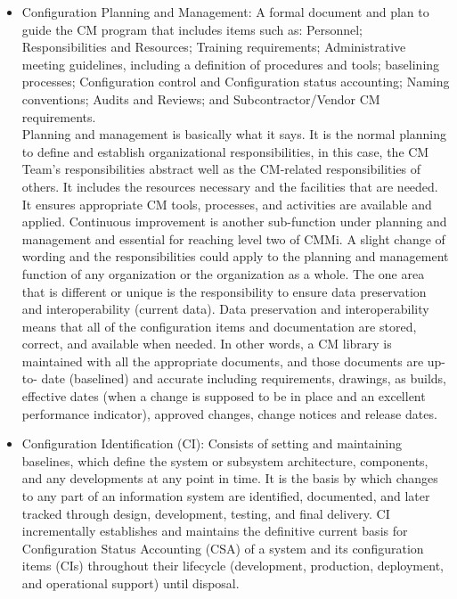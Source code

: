 \documentclass{article}
\begin{document}
\begin{itemize}
    \item Configuration Planning and Management:
    A formal document and plan to guide the CM program that includes items such as:
    Personnel; Responsibilities and Resources; Training requirements; Administrative meeting guidelines, including a definition of procedures and tools;
    baselining processes; Configuration control and Configuration status accounting; Naming conventions; Audits and Reviews; and Subcontractor/Vendor CM requirements. \\
    Planning and management is basically what it says. It is the normal planning to define and
    establish organizational responsibilities, in this case, the CM Team’s responsibilities abstract
    well as the CM-related responsibilities of others. It includes the resources necessary and
    the facilities that are needed. It ensures appropriate CM tools, processes, and activities are
    available and applied. Continuous improvement is another sub-function under planning
    and management and essential for reaching level two of CMMi. A slight change of
    wording and the responsibilities could apply to the planning and management function of
    any organization or the organization as a whole. The one area that is different or unique is
    the responsibility to ensure data preservation and interoperability (current data). Data
    preservation and interoperability means that all of the configuration items and
    documentation are stored, correct, and available when needed. In other words, a CM
    library is maintained with all the appropriate documents, and those documents are up-to-
    date (baselined) and accurate including requirements, drawings, as builds, effective dates
    (when a change is supposed to be in place and an excellent performance indicator),
    approved changes, change notices and release dates.
    \item Configuration Identification (CI):
    Consists of setting and maintaining baselines, which define the system or subsystem architecture,
    components, and any developments at any point in time. It is the basis by which changes to any part of an information system are identified, documented,
    and later tracked through design, development, testing, and final delivery. CI incrementally establishes and maintains the definitive current basis for Configuration Status Accounting (CSA)
    of a system and its configuration items (CIs) throughout their lifecycle (development, production, deployment, and operational support) until disposal. \\

\end{itemize}
\end{document}
